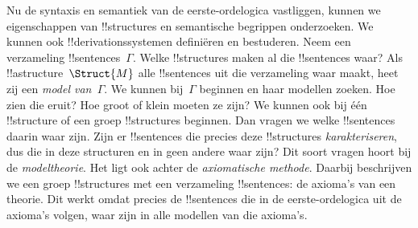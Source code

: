 \documentclass[openany]{memoir}
\begin{document}
\begingroup
\def\olfilename{OLP-0147}
\def\olfilepath{content/first-order-logic/introduction/}
\hypertarget{unit-OLP-0147}{}





Nu de syntaxis en semantiek van de eerste-ordelogica vastliggen, kunnen
we eigenschappen van !!{structure}s en semantische begrippen
onderzoeken. We kunnen ook !!{derivation}ssystemen definiëren en
bestuderen. Neem een verzameling !!{sentence}s~$\Gamma$. Welke
!!{structure}s maken al die !!{sentence}s waar? Als
!!a{structure}~$\Struct{M}$ alle !!{sentence}s uit die verzameling waar maakt, heet zij een
\emph{model van~$\Gamma$}.
We kunnen bij~$\Gamma$ beginnen en haar modellen zoeken. Hoe zien die
eruit? Hoe groot of klein moeten ze zijn? We kunnen ook bij één
!!{structure} of een groep !!{structure}s beginnen. Dan vragen we welke
!!{sentence}s daarin waar zijn. Zijn er !!{sentence}s die precies deze
!!{structure}s \emph{karakteriseren}, dus die in deze structuren en in
geen andere waar zijn? Dit soort vragen hoort bij de \emph{modeltheorie}.
Het ligt ook achter de \emph{axiomatische methode}. Daarbij beschrijven
we een groep !!{structure}s met een verzameling !!{sentence}s: de
axioma's van een theorie. Dit werkt omdat precies de !!{sentence}s die
in de eerste-ordelogica uit de axioma's volgen, waar zijn in alle
modellen van die axioma's.
\end{document}
